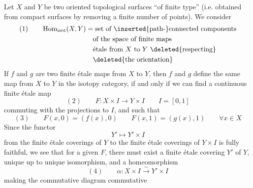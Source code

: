 Let $X$ and $Y$ be two oriented topological surfaces  ``of finite type'' (i.e. obtained from compact surfaces by removing a finite number of points). We consider
\[
\begin{aligned}
(1)\qquad \operatorname{Hom}_{\mathrm{isot}}(X,Y)
&=\text{set of \inserted{path-}connected components}\\
&\quad\text{of the space of finite maps}\\
&\quad\text{étale from $X$ to $Y$ \deleted{respecting}}\\
&\quad\deleted{\text{the orientation}}
\end{aligned}
\]
If $f$ and $g$ are two finite étale maps from $X$ to $Y$, then $f$ and $g$  define the same  map from $X$ to $Y$ in the isotopy category, if and only if we can find a continuous finite étale map
\[
(2)\qquad F:X\times I\longrightarrow Y\times I\qquad I=[0,1]
\]
commuting with the projections to $I$, and such that
\[
(3)\qquad F(x,0)=(f(x),0)\qquad F(x,1)=(g(x),1)\qquad\forall x\in X
\]
Since the functor
\[
Y'\longmapsto Y'\times I
\]
from the finite étale coverings of $Y$ to the finite étale coverings of $Y\times I$ is fully faithful, we see that  for a given $F$, there must exist a finite étale covering $Y'$ of $Y$, unique up to unique isomorphism, and a homeomorphism
\[
(4)\qquad \alpha:X\times I\xrightarrow{\sim}Y'\times I
\]
making the commutative diagram commutative
